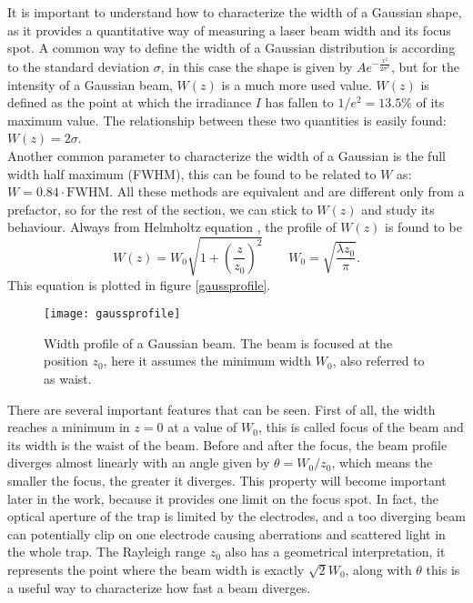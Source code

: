 It is important to understand how to characterize the width of a Gaussian shape, as it provides a quantitative way of measuring a laser beam width and its focus spot. A common way to define the width of a Gaussian distribution is according to the standard deviation $\sigma$, in this case the shape is given by $Ae^{-\frac{x^2}{2\sigma^2}}$, but for the intensity of a Gaussian beam, $W(z)$ is a much more used value. $W(z)$ is defined as the point at which the irradiance $I$ has fallen to $1/e^2 = 13.5\%$ of its maximum value. The relationship between these two quantities is easily found: $W(z) = 2\sigma$.\\
Another common parameter to characterize the width of a Gaussian is the full width half maximum (FWHM), this can be found to be related to $W$ as: $W = 0.84\cdot \text{FWHM}$. All these methods are equivalent and are different only from a prefactor, so for the rest of the section, we can stick to $W(z)$ and study its behaviour. Always from Helmholtz equation \cite{saleh}, the profile of $W(z)$ is found to be
\begin{equation}
W(z) = W_0 \sqrt{1 + \left(\frac{z}{z_0}\right)^2}\qquad W_0 = \sqrt{\frac{\lambda z_0}{\pi}}.
\end{equation}
This equation is plotted in figure \eqref{gaussprofile}.
\begin{figure}
\centering
\texttt{[image: gaussprofile]}
\caption{Width profile of a Gaussian beam. The beam is focused at the position $z_0$, here it assumes the minimum width $W_0$, also referred to as waist.}
\label{gaussprofile}
\end{figure}
There are several important features that can be seen. First of all, the width reaches a minimum in $z=0$ at a value of $W_0$, this is called focus of the beam and its width is the waist of the beam. Before and after the focus, the beam profile diverges almost linearly with an angle given by $\theta = W_0/z_0$, which means the smaller the focus, the greater it diverges. This property will become important later in the work, because it provides one limit on the focus spot. In fact, the optical aperture of the trap is limited by the electrodes, and a too diverging beam can potentially clip on one electrode causing aberrations and scattered light in the whole trap.  The Rayleigh range $z_0$ also has a geometrical interpretation, it represents the point where the beam width is exactly $\sqrt{2}W_0$, along with $\theta$ this is a useful way to characterize how fast a beam diverges.\\

